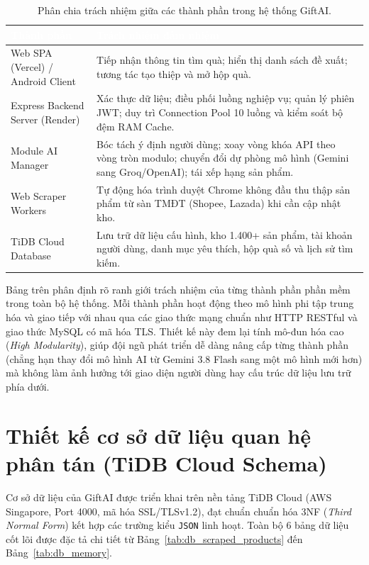 \begin{table}[htbp]
\centering
\caption{Phân chia trách nhiệm giữa các thành phần trong hệ thống GiftAI.}
\label{tab:component_responsibility}
\small
\renewcommand{\arraystretch}{1.25}
\begin{tabularx}{\textwidth}{|p{3.8cm}|X|}
\hline
\rowcolor{PrimaryBlue}
\textcolor{white}{\textbf{Thành phần}} & \textcolor{white}{\textbf{Trách nhiệm đảm nhiệm}} \\
\hline
Web SPA (Vercel) / Android Client & Tiếp nhận thông tin tìm quà; hiển thị danh sách đề xuất; tương tác tạo thiệp và mở hộp quà. \\
\hline
Express Backend Server (Render) & Xác thực dữ liệu; điều phối luồng nghiệp vụ; quản lý phiên JWT; duy trì Connection Pool 10 luồng và kiểm soát bộ đệm RAM Cache. \\
\hline
Module AI Manager & Bóc tách ý định người dùng; xoay vòng khóa API theo vòng tròn modulo; chuyển đổi dự phòng mô hình (Gemini sang Groq/OpenAI); tái xếp hạng sản phẩm. \\
\hline
Web Scraper Workers & Tự động hóa trình duyệt Chrome không đầu thu thập sản phẩm từ sàn TMĐT (Shopee, Lazada) khi cần cập nhật kho. \\
\hline
TiDB Cloud Database & Lưu trữ dữ liệu cấu hình, kho 1.400+ sản phẩm, tài khoản người dùng, danh mục yêu thích, hộp quà số và lịch sử tìm kiếm. \\
\hline
\end{tabularx}
\end{table}

Bảng trên phân định rõ ranh giới trách nhiệm của từng thành phần phần mềm trong toàn bộ hệ thống. Mỗi thành phần hoạt động theo mô hình phi tập trung hóa và giao tiếp với nhau qua các giao thức mạng chuẩn như HTTP RESTful và giao thức MySQL có mã hóa TLS. Thiết kế này đem lại tính mô-đun hóa cao (\textit{High Modularity}), giúp đội ngũ phát triển dễ dàng nâng cấp từng thành phần (chẳng hạn thay đổi mô hình AI từ Gemini 3.8 Flash sang một mô hình mới hơn) mà không làm ảnh hưởng tới giao diện người dùng hay cấu trúc dữ liệu lưu trữ phía dưới.

\section{Thiết kế cơ sở dữ liệu quan hệ phân tán (TiDB Cloud Schema)}

Cơ sở dữ liệu của GiftAI được triển khai trên nền tảng TiDB Cloud (AWS Singapore, Port 4000, mã hóa SSL/TLSv1.2), đạt chuẩn chuẩn hóa 3NF (\textit{Third Normal Form}) kết hợp các trường kiểu \texttt{JSON} linh hoạt. Toàn bộ 6 bảng dữ liệu cốt lõi được đặc tả chi tiết từ Bảng~\ref{tab:db_scraped_products} đến Bảng~\ref{tab:db_memory}.

